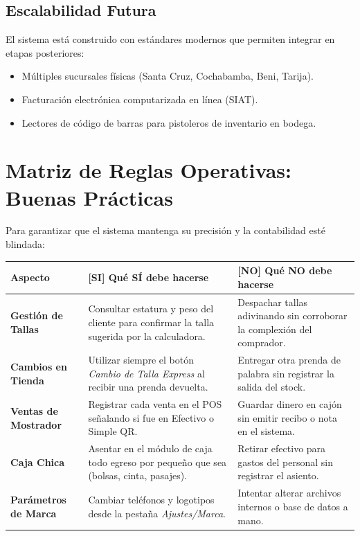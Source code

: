 \documentclass[11pt,a4paper]{article}
\begin{document}
\subsection{Escalabilidad Futura}
El sistema está construido con estándares modernos que permiten integrar en etapas posteriores:
\begin{itemize}
    \item Múltiples sucursales físicas (Santa Cruz, Cochabamba, Beni, Tarija).
    \item Facturación electrónica computarizada en línea (SIAT).
    \item Lectores de código de barras para pistoleros de inventario en bodega.
\end{itemize}

\newpage

\section{Matriz de Reglas Operativas: Buenas Prácticas}

Para garantizar que el sistema mantenga su precisión y la contabilidad esté blindada:

\begin{table}[h!]
\centering
\small
\begin{tabularx}{\linewidth}{p{3.2cm} X X}
\toprule
\textbf{Aspecto} & \textbf{[SI] Qué SÍ debe hacerse} & \textbf{[NO] Qué NO debe hacerse} \\
\midrule
\textbf{Gestión de Tallas} & Consultar estatura y peso del cliente para confirmar la talla sugerida por la calculadora. & Despachar tallas adivinando sin corroborar la complexión del comprador. \\
\addlinespace
\textbf{Cambios en Tienda} & Utilizar siempre el botón \textit{Cambio de Talla Express} al recibir una prenda devuelta. & Entregar otra prenda de palabra sin registrar la salida del stock. \\
\addlinespace
\textbf{Ventas de Mostrador} & Registrar cada venta en el POS señalando si fue en Efectivo o Simple QR. & Guardar dinero en cajón sin emitir recibo o nota en el sistema. \\
\addlinespace
\textbf{Caja Chica} & Asentar en el módulo de caja todo egreso por pequeño que sea (bolsas, cinta, pasajes). & Retirar efectivo para gastos del personal sin registrar el asiento. \\
\addlinespace
\textbf{Parámetros de Marca} & Cambiar teléfonos y logotipos desde la pestaña \textit{Ajustes/Marca}. & Intentar alterar archivos internos o base de datos a mano. \\
\bottomrule
\end{tabularx}
\end{table}
\end{document}
